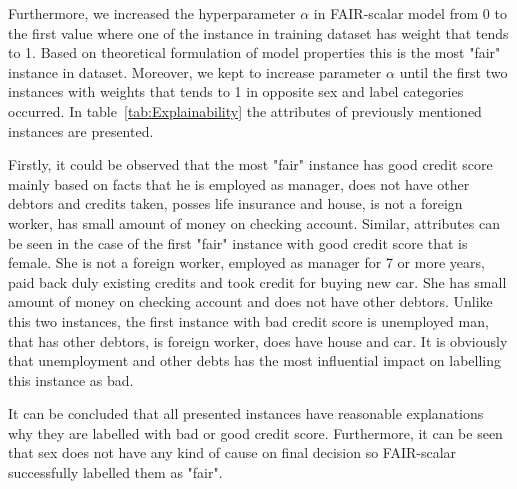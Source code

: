 \documentclass[preprint,12pt]{elsarticle}
\begin{document}
Furthermore, we increased the hyperparameter $\alpha$ in FAIR-scalar model from 0 to the first value where one of the instance in training dataset has weight that tends to 1. Based on theoretical formulation of model properties this is the most "fair" instance in dataset. Moreover, we kept to increase parameter $\alpha$ until the first two instances with weights that tends to 1 in opposite sex and label categories occurred. In table~\ref{tab:Explainability} the attributes of previously mentioned instances are presented.

Firstly, it could be observed that the most "fair" instance has good credit score mainly based on facts that he is employed as manager, does not have other debtors and credits taken, posses life insurance and house, is not a foreign worker, has small amount of money on checking account. Similar, attributes can be seen in the case of the first "fair" instance with good credit score that is female. She is not a foreign worker, employed as manager for 7 or more years, paid back duly existing credits and took credit for buying new car. She has small amount of money on checking account and does not have other debtors. Unlike this two instances, the first instance with bad credit score is unemployed man, that has other debtors, is foreign worker, does have house and car. It is obviously that unemployment and other debts has the most influential impact on labelling this instance as bad.

It can be concluded that all presented instances have reasonable explanations why they are labelled with bad or good credit score. Furthermore, it can be seen that sex does not have any kind of cause on final decision so FAIR-scalar successfully labelled them as "fair".
\end{document}
